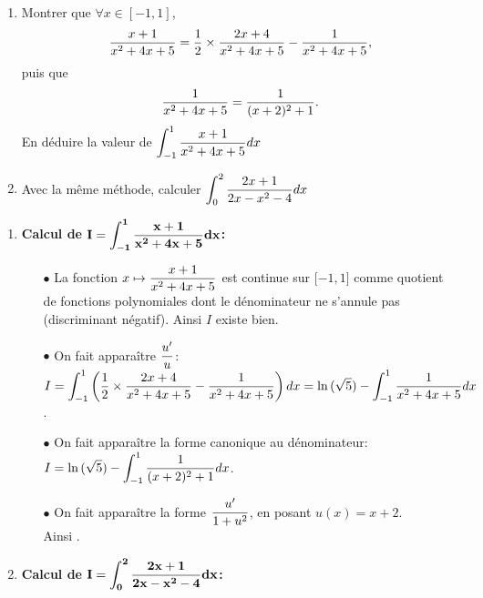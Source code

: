 \documentclass[a4paper, 11pt,reqno]{article}
\begin{document}
\begin{exercice}   \;
	\begin{enumerate}
		\item Montrer que $\forall x \in [-1,1]$, $$\displaystyle \frac{x+1}{x^2+4x+5} =\displaystyle\frac{1}{2}\times \displaystyle\frac{2x+4}{x^2+4x+5}-\displaystyle\frac{1}{x^2+4x+5},$$ puis que $$\displaystyle\frac{1}{x^2+4x+5} =  \displaystyle\frac{1}{(x+2)^2+1}.$$ En d\'eduire la valeur de $\displaystyle \int_{-1}^{1}  \displaystyle\frac{x+1}{x^2+4x+5} dx$\vsec
		\item Avec la m\^eme m\'ethode, calculer $\displaystyle\int_0^2 \displaystyle\frac{2x+1}{2x-x^2-4} dx$
	\end{enumerate}
\end{exercice}
\begin{correction}  \;
	\begin{enumerate}
		\item \textbf{Calcul de $\mathbf{ \displaystyle I=\int_{-1}^{1}  \displaystyle\frac{x+1}{x^2+4x+5} dx}$:}
		      \begin{itemize}
			      \item[$\bullet$] La fonction $x\mapsto \displaystyle\frac{x+1}{x^2+4x+5}$ est continue sur $\lbrack -1,1\rbrack$ comme quotient de fonctions polynomiales dont le d\'enominateur ne s'annule pas (discriminant n\'egatif). Ainsi $I$ existe bien.
			      \item[$\bullet$] On fait appara\^{i}tre $\displaystyle\frac{u^{\prime}}{u}$:\\
			            \noindent $ \displaystyle I=\int_{-1}^1 \left(\displaystyle\frac{1}{2}\times \displaystyle\frac{2x+4}{x^2+4x+5}-\displaystyle\frac{1}{x^2+4x+5}\right)dx=\ln{(\sqrt{5})}- \int_{-1}^1 \displaystyle\frac{1}{x^2+4x+5}dx$.
			      \item[$\bullet$] On fait appara\^{i}tre la forme canonique au d\'enominateur:\\
			            \noindent $ \displaystyle I=\ln{(\sqrt{5})} - \int_{-1}^1 \displaystyle\frac{1}{(x+2)^2+1}dx$.
			      \item[$\bullet$] On fait appara\^{i}tre la forme $\displaystyle\frac{u^{\prime}}{1+u^2}$, en posant $u(x)=x+2$.\\
			            \noindent Ainsi .
		      \end{itemize}
		\item \textbf{Calcul de $\mathbf{ \displaystyle I=\int_0^2 \displaystyle\frac{2x+1}{2x-x^2-4} dx}$:}
		      \begin{itemize}

\end{itemize}
\end{enumerate}
\end{correction}
\end{document}
